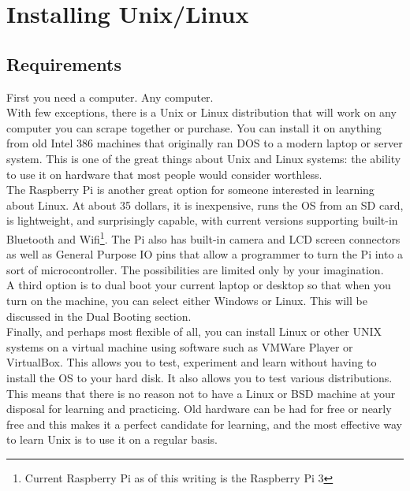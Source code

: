 \chapter{Installing Unix/Linux}

\section{Requirements}

First you need a computer.  Any computer.\\

With few exceptions, there is a Unix or Linux distribution that will work on any computer you can scrape together or purchase.  You can install it on anything from old Intel 386 machines that originally ran DOS to a modern laptop or server system.  This is one of the great things about Unix and Linux systems: the ability to use it on hardware that most people would consider worthless.\\

The Raspberry Pi is another great option for someone interested in learning about Linux.  At about 35 dollars, it is inexpensive, runs the OS from an SD card, is lightweight, and surprisingly capable, with current versions supporting built-in Bluetooth and Wifi\footnote{Current Raspberry Pi as of this writing is the Raspberry Pi 3}.  The Pi also has built-in camera and LCD screen connectors as well as General Purpose IO pins that allow a programmer to turn the Pi into a sort of microcontroller.  The possibilities are limited only by your imagination.\\

A third option is to dual boot your current laptop or desktop so that when you turn on the machine, you can select either Windows or Linux.  This will be discussed in the Dual Booting section.\\

Finally, and perhaps most flexible of all, you can install Linux or other UNIX systems on a virtual machine using software such as VMWare Player or VirtualBox.  This allows you to test, experiment and learn without having to install the OS to your hard disk.  It also allows you to test various distributions.\\

This means that there is no reason not to have a Linux or BSD machine at your disposal for learning and practicing.  Old hardware can be had for free or nearly free and this makes it a perfect candidate for learning, and the most effective way to learn Unix is to use it on a regular basis.\\

